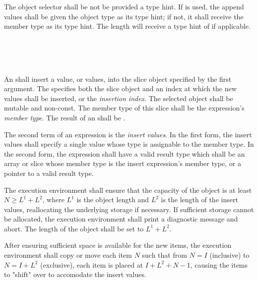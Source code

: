 \specsubsubitem
The object selector shall be not be provided a type hint. If  is
used, the append values shall be given the object type as its type hint; if
not, it shall receive the member type as its type hint. The length will receive
a type hint of  if applicable.


\begin{grammar}
 \\
	  \terminal{(}  \terminal{,}  \terminal{)} \\
	  \terminal{(}  \terminal{,}   \terminal{)} \\
\end{grammar}


\specsubsubitem
An  shall insert a value, or values, into the
slice object specified by the first argument. The
 specifies both the slice object and an index
at which the new values shall be inserted, or the \textit{insertion index}.
The selected object shall be mutable and non-const. The member type of this
slice shall be the expression's \textit{member type}. The result of an
 shall be .

\specsubsubitem
The second term of an  expression is the \textit{insert
values}. In the first form, the insert values shall specify a single value
whose type is assignable to the member type. In the second form, the expression
shall have a valid result type which shall be an array or slice whose member
type is the insert expression's member type, or a pointer to a valid result
type.

\specsubsubitem
The execution environment shall ensure that the capacity of the object is at
least $N \geq L^1 + L^2$, where $L^1$ is the object length and $L^2$ is the
length of the insert values, reallocating the underlying storage if necessary.
If sufficient storage cannot be allocated, the execution environment shall
print a diagnostic message and abort. The length of the object shall be set to
$L^1 + L^2$.

\specsubsubitem
After ensuring sufficient space is available for the new items, the execution
environment shall copy or move each item $N$ such that from $N=I$ (inclusive)
to $N=I+L^2$ (exclusive), each item is placed at $I+L^2+N-1$, causing the items
to "shift" over to accomodate the insert values.

